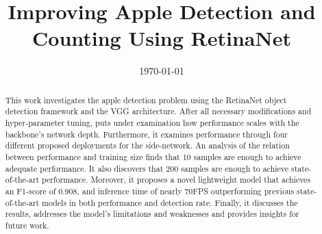\documentclass{ecsthesis}      	%
\begin{document}
\frontmatter
\title      {Improving Apple Detection and Counting Using RetinaNet}
\date       {\today}
\subject    {}
\keywords   {}
\maketitle
\begin{abstract}
This work investigates the apple detection problem using the RetinaNet object detection framework and the VGG architecture. After all necessary modifications and hyper-parameter tuning, puts under examination how performance scales with the backbone's network depth. Furthermore, it examines performance through four different proposed deployments for the side-network. An analysis of the relation between performance and training size finds that 10 samples are enough to achieve adequate performance. It also discovers that 200 samples are enough to achieve state-of-the-art performance. Moreover, it proposes a novel lightweight model that achieves an F1-score of 0.908, and inference time of nearly 70FPS outperforming previous state-of-the-art models in both performance and detection rate. Finally, it discusses the results, addresses the model's limitations and weaknesses and provides insights for future work. 
\end{abstract}
\end{document}
